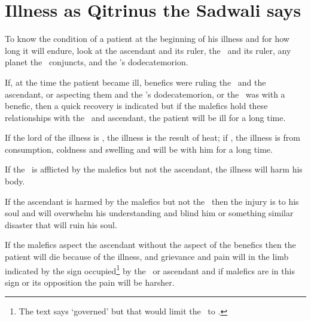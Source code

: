 \section{Illness as Qitrinus the Sadwali says}
To know the condition of a patient at the beginning of his illness and for how long it will endure, look at the ascendant and its ruler, the \Moon\, and its ruler, any planet the \Moon\, conjuncts, and the \Moon's dodecatemorion.

If, at the time the patient became ill, benefics were ruling the \Moon\, and the ascendant, or aspecting them and the \Moon's dodecatemorion, or the \Moon\, was with a benefic, then a quick recovery is indicated but if the malefics hold these relationships with the \Moon\, and ascendant, the patient will be ill for a long time.

If the lord of the illness is \Mars, the illness is the result of heat; if \Saturn, the illness is from consumption, coldness and swelling and will be with him for a long time.

If the \Moon\, is afflicted by the malefics but not the ascendant, the illness will harm his body.

If the ascendant is harmed by the malefics but not the \Moon\, then the injury is to his soul and will overwhelm his understanding and blind him or something similar disaster that will ruin his soul.

If the malefics aspect the ascendant without the aspect of the benefics then the patient will die because of the illness, and grievance and pain will in the limb indicated by the sign occupied\footnote{The text says `governed' but that would limit the \Moon\, to \Cancer.} by the \Moon\, or ascendant and if malefics are in this sign or its opposition the pain will be harsher.


